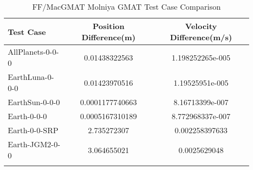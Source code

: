 \begin{table}[htbp!]
\centering
\caption{ FF/MacGMAT Molniya GMAT Test Case Comparison}
      \begin{tabular}{lcc}
      \hline\hline
          Test Case & Position Difference(m) & Velocity Difference(m/s) \\
         \hline
         AllPlanets-0-0-0 & 0.01438322563 & 1.198252265e-005 \\
         EarthLuna-0-0-0 & 0.01423970516 & 1.19525951e-005 \\
         EarthSun-0-0-0 & 0.0001177740663 & 8.16713399e-007 \\
         Earth-0-0-0 & 0.0005167310189 & 8.772968337e-007 \\
         Earth-0-0-SRP & 2.735272307 & 0.002258397633 \\
         Earth-JGM2-0-0 & 3.064655021 & 0.0025629048 \\
      \hline\hline
      \label{Table: Molniya GMAT Table} 
\end{tabular}
\end{table}

